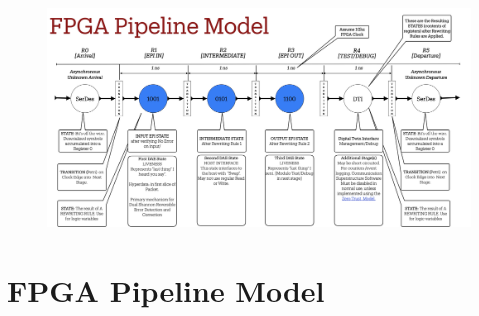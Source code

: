 \documentclass[../HFT-main.tex]{subfiles}
\begin{document}
%

\clearpage
\begin{fullwidth}
\begin{figure}[ht]
  \centering
  \includegraphics[width=1.5\linewidth]{../figures/FPGA-Pipeline-Model.png}

\end{figure}
\end{fullwidth}
  
\section{FPGA Pipeline Model}
\end{document}
